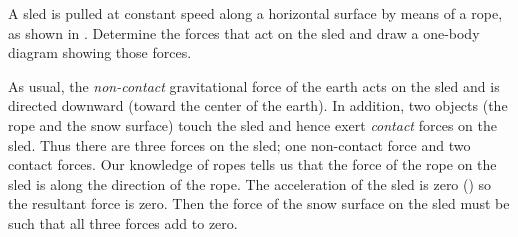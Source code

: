 {
A sled is pulled at constant speed along a horizontal surface by means of
a rope, as shown in .
Determine the forces that act on the sled and draw a one-body diagram
showing those forces.

As usual, the \textit{non-contact} gravitational force of the earth acts
on the sled and is directed downward (toward the center of the earth).
In addition, two objects (the rope and the snow surface) touch the sled
and hence exert \textit{contact} forces on the sled.
Thus there are three forces on the sled; one non-contact force and two
contact forces.
Our knowledge of ropes tells us that the force of the rope on the sled is
along the direction of the rope.
The acceleration of the sled is zero () so the resultant
force is zero.
Then the force of the snow surface on the sled must be such that all
three forces add to zero.
}%
%
